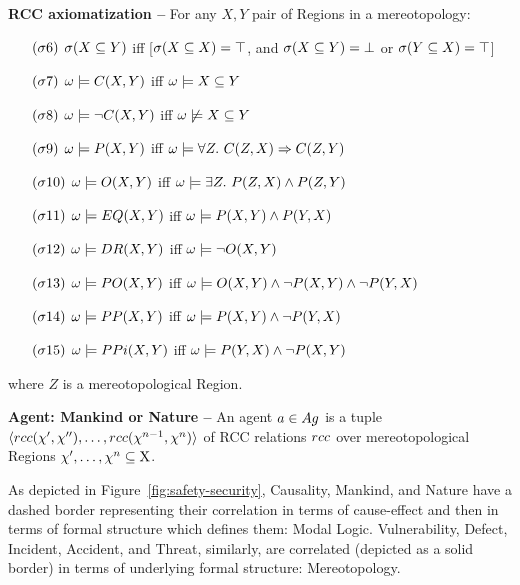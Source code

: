 \begin{definition}{\bf RCC axiomatization --}
	For any $X,Y$ pair of Regions in a mereotopology:
	\begin{itemize}[noitemsep]
	\item[$(\sigma6)$] $\sigma(X\subseteq Y)$ iff [$\sigma(X\subseteq X)=\top$, and $\sigma(X\subseteq Y)=\bot$ or $\sigma(Y\subseteq X)=\top$]
	\item[$(\sigma7)$] $\omega\models C(X,Y)$ iff $\omega\models X\subseteq Y$ 
	\item[$(\sigma8)$] $\omega\models\neg C(X,Y)$ iff  $\omega\not\models X\subseteq Y$
	\item[$(\sigma9)$] $\omega\models P(X,Y)$ iff $\omega\models\forall Z.~C(Z,X)\Rightarrow C(Z,Y)$
	\item[$(\sigma10)$] $\omega\models O(X,Y)$ iff $\omega\models\exists Z.~P(Z,X)\wedge P(Z,Y)$
	\item[$(\sigma11)$] $\omega\models EQ(X,Y)$ iff $\omega\models P(X,Y)\wedge P(Y,X)$
	\item[$(\sigma12)$] $\omega\models DR(X,Y)$ iff $\omega\models\neg O(X,Y)$
	\item[$(\sigma13)$] $\omega\models PO(X,Y)$ iff $\omega\models O(X,Y)\wedge\neg P(X,Y)\wedge\neg P(Y,X)$
	\item[$(\sigma14)$] $\omega\models PP(X,Y)$ iff $\omega\models P(X,Y)\wedge\neg P(Y,X)$
	\item[$(\sigma15)$] $\omega\models PPi(X,Y)$ iff $\omega\models P(Y,X)\wedge\neg P(X,Y)$
\end{itemize}
where $Z$ is a mereotopological Region.
\end{definition}

\begin{definition}{\bf Agent: Mankind or Nature --}\label{def:mankind-nature}
	An agent $a\in Ag$ is a tuple
	$\langle rcc(\chi',\chi''),\ldots,rcc(\chi^{n-1},\chi^n)\rangle$
	of RCC relations $rcc$ over mereotopological Regions
	${\chi',\ldots,\chi^n}\subseteq\mathrm{X}$. 
\end{definition}

As depicted in Figure~\ref{fig:safety-security}, Causality, Mankind, and Nature
have a dashed border representing their correlation in terms of cause-effect
and then in terms of formal structure which defines them: Modal Logic.
Vulnerability, Defect, Incident, Accident, and Threat, similarly, 
are correlated (depicted as a solid border) in terms of underlying 
formal structure: Mereotopology.

